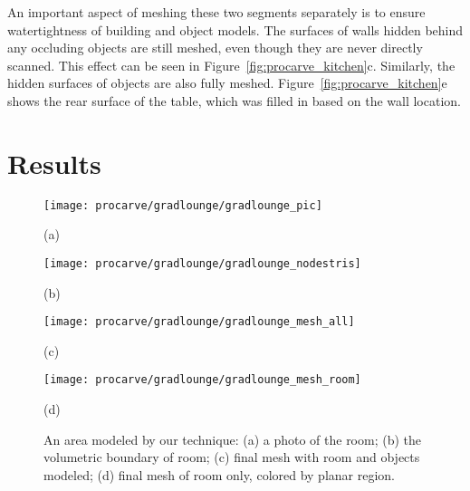 \documentclass[12pt,onecolumn,oneside]{book}
\begin{document}
An important aspect of meshing these two segments separately is to ensure watertightness of building and object models.  The surfaces of walls hidden behind any occluding objects are still meshed, even though they are never directly scanned.  This effect can be seen in Figure~\ref{fig:procarve_kitchen}c.  Similarly, the hidden surfaces of objects are also fully meshed.  Figure~\ref{fig:procarve_kitchen}e shows the rear surface of the table, which was filled in based on the wall location.

\FloatBarrier
\section{Results}
\label{sec:procarve_results}

\begin{figure}[t]
	\begin{minipage}[c]{0.49\linewidth}
		\centerline{\texttt{[image: procarve/gradlounge/gradlounge\_pic]}}
		\centerline{(a)}
	\end{minipage}
	\hfill
	\begin{minipage}[c]{0.49\linewidth}
		\centerline{\texttt{[image: procarve/gradlounge/gradlounge\_nodestris]}}
		\centerline{(b)}
	\end{minipage}
	
	\begin{minipage}[c]{0.49\linewidth}
		\centerline{\texttt{[image: procarve/gradlounge/gradlounge\_mesh\_all]}}
		\centerline{(c)}
	\end{minipage}
	\hfill
	\begin{minipage}[c]{0.49\linewidth}
		\centerline{\texttt{[image: procarve/gradlounge/gradlounge\_mesh\_room]}}
		\centerline{(d)}
	\end{minipage}

	\caption[Surface Reconstruction of small room.]{An area modeled by our technique: (a) a photo of the room; (b) the volumetric boundary of room; (c) final mesh with room and objects modeled; (d) final mesh of room only, colored by planar region.}
	\label{fig:procarve_gradlounge}
\end{figure}
\end{document}
